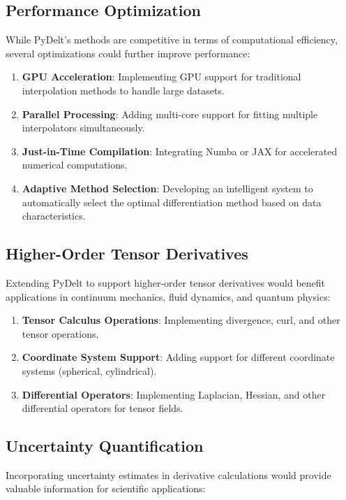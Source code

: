 \documentclass[conference]{IEEEtran}
\begin{document}
\subsection{Performance Optimization}

While PyDelt's methods are competitive in terms of computational efficiency, several optimizations could further improve performance:

\begin{enumerate}
\item \textbf{GPU Acceleration}: Implementing GPU support for traditional interpolation methods to handle large datasets.
\item \textbf{Parallel Processing}: Adding multi-core support for fitting multiple interpolators simultaneously.
\item \textbf{Just-in-Time Compilation}: Integrating Numba or JAX for accelerated numerical computations.
\item \textbf{Adaptive Method Selection}: Developing an intelligent system to automatically select the optimal differentiation method based on data characteristics.
\end{enumerate}

\subsection{Higher-Order Tensor Derivatives}

Extending PyDelt to support higher-order tensor derivatives would benefit applications in continuum mechanics, fluid dynamics, and quantum physics:

\begin{enumerate}
\item \textbf{Tensor Calculus Operations}: Implementing divergence, curl, and other tensor operations.
\item \textbf{Coordinate System Support}: Adding support for different coordinate systems (spherical, cylindrical).
\item \textbf{Differential Operators}: Implementing Laplacian, Hessian, and other differential operators for tensor fields.
\end{enumerate}

\subsection{Uncertainty Quantification}

Incorporating uncertainty estimates in derivative calculations would provide valuable information for scientific applications:
\end{document}
